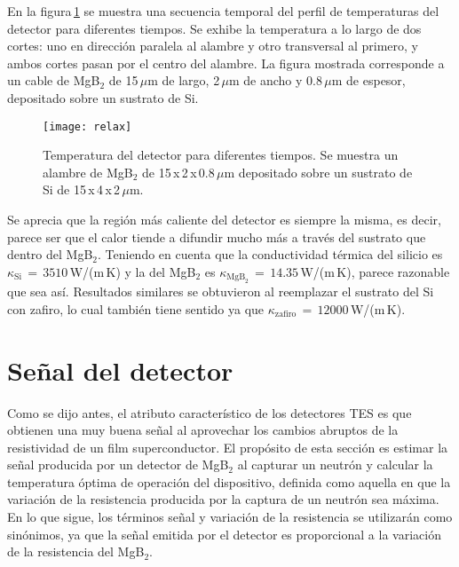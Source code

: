 En la figura\,\ref{fig:cortes} se muestra una secuencia temporal del perfil de temperaturas del detector para diferentes tiempos. Se exhibe la temperatura a lo largo de dos cortes: uno en dirección paralela al alambre y otro transversal al primero, y ambos cortes pasan por el centro del alambre. La figura mostrada corresponde a un cable de MgB$_2$ de 15\,$\mu$m de largo, 2\,$\mu$m de ancho y 0.8\,$\mu$m de espesor, depositado sobre un sustrato de Si.
\begin{figure}[tbh!]
 \begin{center}
    \texttt{[image: relax]}
  \end{center}
  \caption[Temperatura del detector para diferentes tiempos.]{Temperatura del detector para diferentes tiempos. Se muestra un alambre de MgB$_2$ de 15\,x\,2\,x\,0.8\,$\mu$m depositado sobre un sustrato de Si de 15\,x\,4\,x\,2\,$\mu$m.}
\label{fig:cortes}
\end{figure}

Se aprecia que la región más caliente del detector es siempre la misma, es decir, parece ser que el calor tiende a difundir mucho más a través del sustrato que dentro del MgB$_2$. Teniendo en cuenta que la conductividad térmica del silicio es $\kappa_{\text{Si}}\,=\,3510$\,W/(m\,K) y la del MgB$_2$ es $\kappa_{\text{MgB}_2}\,=\,14.35$\,W/(m\,K)\cite{Glassbrenner1964,Bauer2001}, parece razonable que sea así. Resultados similares se obtuvieron al reemplazar el sustrato del Si con zafiro, lo cual también tiene sentido ya que $\kappa_{\text{zafiro}}\,=\,12000$\,W/(m\,K)\cite{Ekin2006}.
\section{Señal del detector}\label{S:signal}
Como se dijo antes, el atributo característico de los detectores TES es que obtienen una muy buena señal al aprovechar los cambios abruptos de la resistividad de un film superconductor. El propósito de esta sección es estimar la señal producida por un detector de MgB$_2$ al capturar un neutrón y calcular la temperatura óptima de operación del dispositivo, definida como aquella en que la variación de la resistencia producida por la captura de un neutrón sea máxima. En lo que sigue, los términos señal y variación de la resistencia se utilizarán como sinónimos, ya que la señal emitida por el detector es proporcional a la variación de la resistencia del MgB$_2$.

